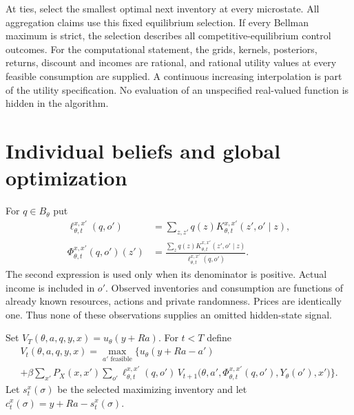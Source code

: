 \documentclass[11pt]{article}
\begin{document}
At ties, select the smallest optimal next inventory at every microstate. All aggregation claims use this fixed equilibrium selection. If every Bellman maximum is strict, the selection describes all competitive-equilibrium control outcomes. For the computational statement, the grids, kernels, posteriors, returns, discount and incomes are rational, and rational utility values at every feasible consumption are supplied. A continuous increasing interpolation is part of the utility specification. No evaluation of an unspecified real-valued function is hidden in the algorithm.

\section{Individual beliefs and global optimization}
For $q\in B_\theta$ put
\begin{align}
 \ell^{x,x'}_{\theta,t}(q,o')
 &=\sum_{z,z'}q(z)K^{x,x'}_{\theta,t}(z',o'\mid z),\label{likelihood}\\
 \Phi^{x,x'}_{\theta,t}(q,o')(z')
 &=\frac{\sum_zq(z)K^{x,x'}_{\theta,t}(z',o'\mid z)}
               {\ell^{x,x'}_{\theta,t}(q,o')}.\label{filter}
\end{align}
The second expression is used only when its denominator is positive. Actual income is included in $o'$. Observed inventories and consumption are functions of already known resources, actions and private randomness. Prices are identically one. Thus none of these observations supplies an omitted hidden-state signal.

Set $V_T(\theta,a,q,y,x)=u_\theta(y+Ra)$. For $t<T$ define
\begin{multline}\label{bellman}
 V_t(\theta,a,q,y,x)=\max_{a'\text{ feasible}}\bigg\{
 u_\theta(y+Ra-a')\\
 +\beta\sum_{x'}P_X(x,x')
 \sum_{o'}\ell^{x,x'}_{\theta,t}(q,o')\,
 V_{t+1}\bigl(\theta,a',\Phi^{x,x'}_{\theta,t}(q,o'),Y_\theta(o'),x'\bigr)
 \bigg\}.
\end{multline}
Let $s_t^x(\sigma)$ be the selected maximizing inventory and let
$c_t^x(\sigma)=y+Ra-s_t^x(\sigma)$.
\end{document}
